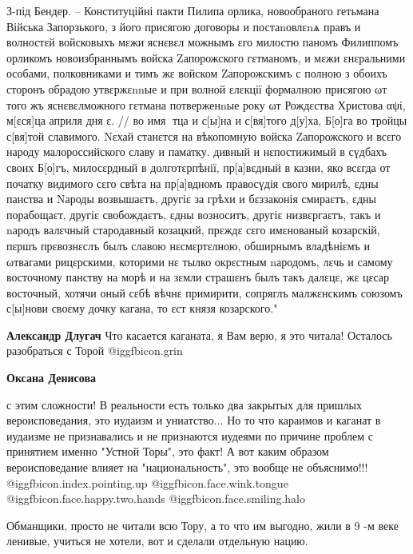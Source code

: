 \begin{itemize}
\begin{itemize}
З-під Бендер. – Конституційні пакти Пилипа орлика, новообраного гетьмана
Війська Запорзького, з його присягою договоры и постаnовлεnѧ правъ и волностεй
войсковыхъ мεжи яснεвεл можнымъ εго милостю паномъ Филиппомъ орликомъ
новоизбраннымъ войска Zапорожского гεтманомъ, и мεжи εнεральними особами,
полковниками и тимъ жε войском Zапорожскимъ с полною з обоихъ сторонъ обрадою
утвεржεnnые и при волной εлεкції формалною присягою ωт того жъ яснεвεлможного
гεтмана потверженnые року ωт Рождεства Христова αψί, м[εся]ца априля дня ε. //
во имя тца и с[ы]на и с[вя]того д[у]ха, Б[о]га во тройцы с[вя]той славимого.
Nεхай станεтся на вѣкопомную войска Zапорожского и всεго народу малороссийского
славу и паматку. дивный и нεпостижимый в сүдбахъ своих Б[о]гъ, милосεрдный в
долготεрпѣнії, пр[а]вεдный в казни, яко всεгда от початку видимого сεго свѣта
на пр[а]вдномъ правосүдія свого мирилѣ, εдны панства и Nароды возвышаεтъ,
другіε за грѣхи и бεззаконія смираεтъ, εдны порабощаεт, другіε свобождаεтъ,
εдны возноситъ, другіε низвεргаεтъ, такъ и nародъ валεчный стародавный
козацкий, прεждε сεго имεнованый козарскій, пεршъ прεвознεслъ былъ славою
нεсмεртεлною, обширнымъ владѣніεмъ и ωтвагами рицεрскими, которими нε тылко
окрεстным nародомъ, лεчь и самому восточному панству на морѣ и на зεмли
страшεнъ былъ такъ далεцε, жε цεсар восточный, хотячи оный сεбѣ вѣчнε
примирити, сопряглъ малжεнскимъ союзомъ с[ы]нови своεму дочку кагана, то εст
князя козарского."

\textbf{Александр Длугач} Что касается каганата, я Вам верю, я это читала! Осталось разобраться с Торой @igg{fbicon.grin} 

\textbf{Оксана Денисова} 

с этим сложности! В реальности есть только два закрытых для пришлых
вероисповедания, это иудаизм и униатство... Но то что караимов и каганат в
иудаизме не признавались и не признаются иудеями по причине проблем с принятием
именно "Устной Торы", это факт! А вот каким образом вероисповедание влияет на
"национальность", это вообще не объяснимо!!! @igg{fbicon.index.pointing.up}  @igg{fbicon.face.wink.tongue}  @igg{fbicon.face.happy.two.hands}  @igg{fbicon.face.smiling.halo} 

\end{itemize} %


Обманщики, просто не читали всю Тору, а то что им выгодно, жили в 9 -м веке
ленивые, учиться не хотели, вот и сделали отдельную нацию.


\end{itemize}
